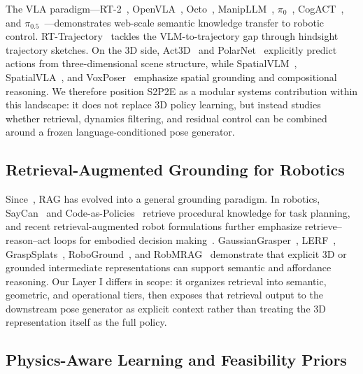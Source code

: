 \documentclass[12pt]{article}
\begin{document}
The VLA paradigm---RT-2~\cite{brohan2023rt2}, OpenVLA~\cite{kim2024openvla}, Octo~\cite{octo2024octo}, ManipLLM~\cite{li2024manipllm}, $\pi_0$~\cite{black2024pi0}, CogACT~\cite{li2024cogact}, and $\pi_{0.5}$~\cite{black2025pi05}---demonstrates web-scale semantic knowledge transfer to robotic control. RT-Trajectory~\cite{gu2024rttrajectory} tackles the VLM-to-trajectory gap through hindsight trajectory sketches. On the 3D side, Act3D~\cite{gervet2023act3d} and PolarNet~\cite{chen2023polarnet} explicitly predict actions from three-dimensional scene structure, while SpatialVLM~\cite{chen2024spatialvlm}, SpatialVLA~\cite{qu2025spatialvla}, and VoxPoser~\cite{jiang2023voxposer} emphasize spatial grounding and compositional reasoning. We therefore position S2P2E as a modular systems contribution within this landscape: it does not replace 3D policy learning, but instead studies whether retrieval, dynamics filtering, and residual control can be combined around a frozen language-conditioned pose generator.

\subsection{Retrieval-Augmented Grounding for Robotics}

Since~\cite{lewis2020rag}, RAG has evolved into a general grounding paradigm. In robotics, SayCan~\cite{ahn2022saycan} and Code-as-Policies~\cite{liang2023codeaspolicies} retrieve procedural knowledge for task planning, and recent retrieval-augmented robot formulations further emphasize retrieve--reason--act loops for embodied decision making~\cite{shree2026rar}. GaussianGrasper~\cite{zheng2024gaussiangrasper}, LERF~\cite{kerr2023lerf}, GraspSplats~\cite{chen2024graspsplats}, RoboGround~\cite{huang2025roboground}, and RobMRAG~\cite{xie2026robmrag} demonstrate that explicit 3D or grounded intermediate representations can support semantic and affordance reasoning. Our Layer I differs in scope: it organizes retrieval into semantic, geometric, and operational tiers, then exposes that retrieval output to the downstream pose generator as explicit context rather than treating the 3D representation itself as the full policy.

\subsection{Physics-Aware Learning and Feasibility Priors}
\end{document}
